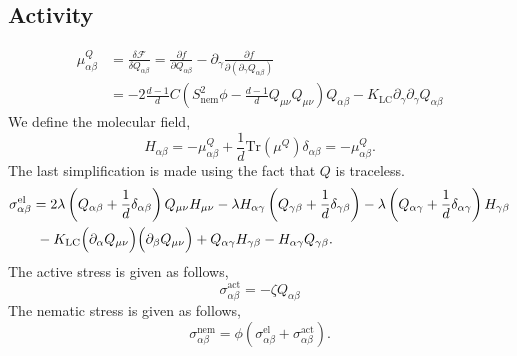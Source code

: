 \documentclass[fleqn,a4paper]{article} %
\numberwithin{equation}{section} %
\numberwithin{figure}{section} %
\numberwithin{algorithm}{section} %
\begin{document}
\subsection{Activity}
\begin{equation}
\begin{split}
    \mu^Q_{\alpha \beta} &= \frac{\delta \mathcal{F}}{\delta Q_{\alpha \beta}} = \frac{\partial f}{\partial Q_{\alpha \beta}} - \partial_\gamma\frac{\partial f}{\partial\left(\partial_\gamma Q_{\alpha \beta}\right)}\\
    &= -2\frac{d-1}{d} C \left(S_\text{nem}^2 \phi - \frac{d-1}{d}Q_{\mu\nu}Q_{\mu\nu}\right)Q_{\alpha \beta} - K_\text{LC}\partial_\gamma \partial_\gamma Q_{\alpha \beta}
\end{split}
\end{equation}
We define the molecular field,
\begin{equation}
    H_{\alpha\beta} = -\mu^Q_{\alpha\beta} + \frac{1}{d} \text{Tr}\left(\mu^Q\right)\delta_{\alpha\beta} = -\mu^Q_{\alpha\beta}.
\end{equation}
The last simplification is made using the fact that $Q$ is traceless. 
\begin{equation}
\begin{split}
    \sigma_{\alpha \beta}^\text{el} &= 2\lambda \left(Q_{\alpha \beta} + \frac{1}{d} \delta_{\alpha\beta}\right)Q_{\mu\nu}H_{\mu\nu} - \lambda H_{\alpha \gamma}\left(Q_{\gamma \beta} + \frac{1}{d} \delta_{\gamma\beta}\right) - \lambda \left(Q_{\alpha \gamma} + \frac{1}{d} \delta_{\alpha\gamma}\right)H_{\gamma\beta}\\
    &\ - K_\text{LC}\Bigl(\partial_\alpha Q_{\mu \nu}\Bigr) \Bigl(\partial_\beta Q_{\mu \nu}\Bigr) + Q_{\alpha \gamma}H_{\gamma\beta} - H_{\alpha\gamma}Q_{\gamma\beta}.
\end{split}
\end{equation}
The active stress is given as follows,
\begin{equation}
    \sigma_{\alpha \beta}^\text{act} = - \zeta Q_{\alpha \beta}
\end{equation}
The nematic stress is given as follows,
\begin{equation}
    \sigma_{\alpha\beta}^\text{nem} = \phi \left(\sigma_{\alpha \beta}^\text{el} + \sigma_{\alpha \beta}^\text{act}\right).
\end{equation}

\clearpage %
\printbibliography{}
\end{document}
